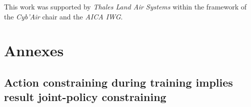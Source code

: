 \documentclass{ecai}
\newcounter{proof}
\begin{document}







\begin{ack}
    This work was supported by \emph{Thales Land Air Systems} within the framework of the \emph{Cyb'Air} chair and the \emph{AICA IWG}.
\end{ack}





\newpage

\section*{Annexes}

\subsection*{Action constraining during training implies result joint-policy constraining}

\end{document}
